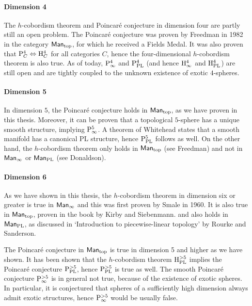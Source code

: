 

\paragraph{Dimension 4}
The $h$-cobordism theorem and Poincaré conjecture in dimension four are partly still an open problem.
The Poincaré conjecture was proven by Freedman in 1982 in the category $\textsf{Man}_{\text{top}}$, for which he received a Fields Medal.
It was also proven that $\mathrm P_{C}^{4} \Leftrightarrow \mathrm H_{C}^{4}$ for all categories $C$, hence the four-dimensional $h$-cobordism theorem is also true.
As of today, $\mathrm P_{\infty}^{4}$ and $\mathrm P_{\text{PL}}^{4}$ (and hence $\mathrm H_{\infty}^{4}$ and  $\mathrm H_{\text{PL}}^{4}$) are still open and are tightly coupled to the unknown existence of exotic $4$-spheres.



\paragraph{Dimension 5}
In dimension $5$, the  Poincaré conjecture holds in $\textsf{Man}_{\text{top}}$, as we have proven in this thesis.
Moreover, it can be proven that a topological $5$-sphere has a unique smooth structure, implying $\mathrm P_{\infty}^{5}$.
A theorem of Whitehead states that a smooth manifold has a canonical PL structure, hence  $\mathrm P_{\text{PL}}^{5}$ follows as well.
On the other hand, the $h$-cobordism theorem only holds in $\textsf{Man}_{\text{top}}$ (see Freedman) and not in $\textsf{Man}_{\infty}$ or $\textsf{Man}_{\text{PL}}$ (see Donaldson).




\paragraph{Dimension 6}

As we have shown in this thesis, the $h$-cobordism theorem in dimension six or greater is true in $\textsf{Man}_{\infty}$ and this was first proven by Smale in 1960.
It is also true in $\textsf{Man}_{\text{top}}$, proven in the book by Kirby and Siebenmann. and also holds in $\textsf{Man}_{\text{PL}}$, as discussed in `Introduction to piecewise-linear topology' by Rourke and Sanderson.

The Poincaré conjecture in $\textsf{Man}_{\text{top}}$ is true in dimension 5 and higher as we have shown.
It has been shown that the $h$-cobordism theorem $\mathrm H_{\text{PL}}^{>5}$ implies the Poincaré conjecture $\mathrm P_{\text{PL}}^{>5}$, hence $\mathrm P_{\text{PL}}^{>5}$ is true as well.
The smooth Poincaré conjecture $\mathrm P_{\infty}^{>5}$ is in general not true, because of the existence of exotic spheres.
In particular, it is conjectured that spheres of a sufficiently high dimension always admit exotic structures, hence $\mathrm P_{\infty}^{>5}$ would be usually false.


